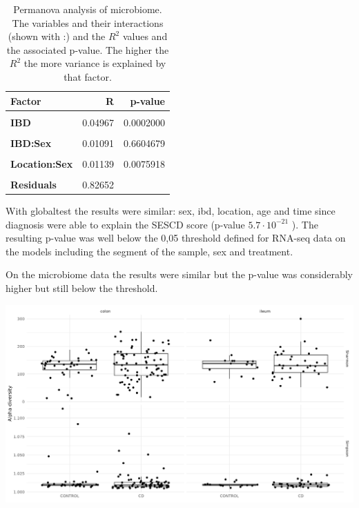 \documentclass[
  a4paper,
]{book}
\let\origfigure\figure
\let\endorigfigure\endfigure
\renewenvironment{figure}[1][2] {
    \expandafter\origfigure\expandafter[!ht]
} {
    \endorigfigure
}
\begin{document}
\begin{table}[H]

\caption[Permanova analysis of microbiome]{\label{tab:hsct-permanova-microbiome}Permanova analysis of microbiome. The variables and their interactions (shown with :) and the $R^2$ values and the associated p-value. The higher the $R^2$ the more variance is explained by that factor.}
\centering
\begin{tabular}[t]{|>{}l|r|>{}r|}
\hline
\textbf{Factor} & \textbf{R} & \textbf{p-value}\\
\hline
\textbf{\cellcolor{gray!6}{Location}} & \cellcolor{gray!6}{0.06061} & \cellcolor{gray!6}{0.0002000}\\
\hline
\textbf{IBD} & 0.04967 & 0.0002000\\
\hline
\textbf{\cellcolor{gray!6}{Sex}} & \cellcolor{gray!6}{0.01712} & \cellcolor{gray!6}{0.0003999}\\
\hline
\textbf{IBD:Sex} & 0.01091 & 0.6604679\\
\hline
\textbf{\cellcolor{gray!6}{Location:IBD}} & \cellcolor{gray!6}{0.02089} & \cellcolor{gray!6}{0.8476305}\\
\hline
\textbf{Location:Sex} & 0.01139 & 0.0075918\\
\hline
\textbf{\cellcolor{gray!6}{Location:IBD:Sex}} & \cellcolor{gray!6}{0.00289} & \cellcolor{gray!6}{0.9994001}\\
\hline
\textbf{Residuals} & 0.82652 & \\
\hline
\end{tabular}
\end{table}

With globaltest the results were similar: sex, ibd, location, age and time since diagnosis were able to explain the SESCD score (p-value \(5.7 \cdot 10^{-21}\) ).
The resulting p-value was well below the 0,05 threshold defined for RNA-seq data on the models including the segment of the sample, sex and treatment.

On the microbiome data the results were similar but the p-value was considerably higher but still below the threshold.

\begin{figure}
\includegraphics[width=1\linewidth]{images/hsct-ASV-diversity} \caption[Microbiome diversity on HSCT dataset.]{Microbiome diversity on HSCT dataset. On the upper section the Shannon effective and on the lower row the Simpson effective diversity splitted by colon and ileum and controls and CD.}\label{fig:hsct-diversity}
\end{figure}
\end{document}
